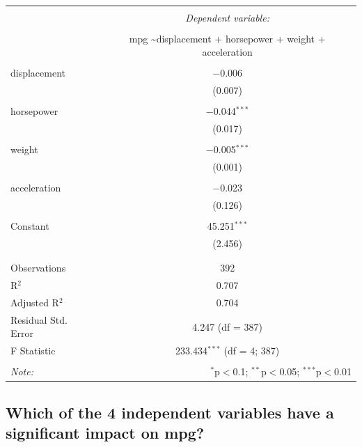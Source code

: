 \documentclass[]{article}
\begin{document}
\begin{table}[!htbp] \centering 
  \caption{} 
  \label{} 
\begin{tabular}{@{\extracolsep{5pt}}lc} 
\\[-1.8ex]\hline 
\hline \\[-1.8ex] 
 & \multicolumn{1}{c}{\textit{Dependent variable:}} \\ 
\cline{2-2} 
\\[-1.8ex] & mpg \textasciitilde displacement + horsepower + weight + acceleration \\ 
\hline \\[-1.8ex] 
 displacement & $-$0.006 \\ 
  & (0.007) \\ 
  & \\ 
 horsepower & $-$0.044$^{***}$ \\ 
  & (0.017) \\ 
  & \\ 
 weight & $-$0.005$^{***}$ \\ 
  & (0.001) \\ 
  & \\ 
 acceleration & $-$0.023 \\ 
  & (0.126) \\ 
  & \\ 
 Constant & 45.251$^{***}$ \\ 
  & (2.456) \\ 
  & \\ 
\hline \\[-1.8ex] 
Observations & 392 \\ 
R$^{2}$ & 0.707 \\ 
Adjusted R$^{2}$ & 0.704 \\ 
Residual Std. Error & 4.247 (df = 387) \\ 
F Statistic & 233.434$^{***}$ (df = 4; 387) \\ 
\hline 
\hline \\[-1.8ex] 
\textit{Note:}  & \multicolumn{1}{r}{$^{*}$p$<$0.1; $^{**}$p$<$0.05; $^{***}$p$<$0.01} \\ 
\end{tabular} 
\end{table}

\newpage

\subsection{Which of the 4 independent variables have a significant
impact on
mpg?}\label{which-of-the-4-independent-variables-have-a-significant-impact-on-mpg}
\end{document}
